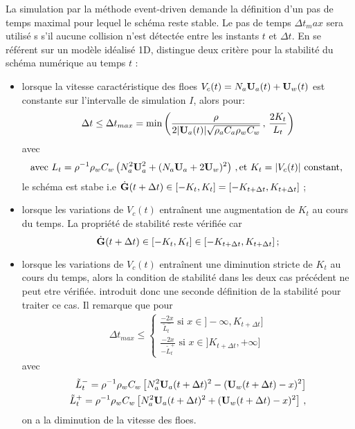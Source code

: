 La simulation par la méthode event-driven demande la définition d'un pas de temps maximal pour lequel le schéma reste stable. Le pas de temps $\Delta t_max$ sera utilisé s
s'il aucune collision n'est détectée entre les instants $t$ et $\Delta t$. En se référent sur un modèle idéalisé 1D, \citeauthor{rabatel2015thesis} distingue deux critère pour la stabilité du schéma numérique au temps $t$ :
\begin{itemize}
    \item lorsque la vitesse caractéristique des floes $V_c(t) = N_a \bm{\mathrm{U}}_a(t) + \bm{\mathrm{U}}_w(t)$ est constante sur l'intervalle de simulation $I$, alors pour:  
    \begin{align} \label{eq:dtmax1}
        \Delta t \leq \Delta t_{max} = \min{ \left(\frac{\rho}{2 \vert \bm{\mathrm{U}}_a(t) \vert \sqrt{\rho_a C_a \rho_w C_w}} \,, \,\frac{2K_t}{L_t} \right)}
    \end{align}
    avec 
    $$
    \text{avec } L_t = \rho^{-1} \rho_w C_w \left( N_a^2 \bm{\mathrm{U}}_a^2 + (N_a\bm{\mathrm{U}}_a + 2 \bm{\mathrm{U}}_w)^2 \right) \,, \text{et } K_t = \vert V_c(t) \vert \text{ constant, }
    $$
    le schéma est stabe i.e $\dot{\bm{\mathrm{G}}} (t + \Delta t) \in [-K_t, K_t] = [-K_{t + \Delta t}, K_{t + \Delta t}]$ ;
    \item lorsque les variations de $V_c(t)$ entraînent une augmentation de $K_t$ au cours du temps. La propriété de stabilité reste vérifiée car $$\dot{\bm{\mathrm{G}}} (t + \Delta t) \in [-K_t, K_t] \in [-K_{t + \Delta t}, K_{t + \Delta t}] \,;$$
    \item lorsque les variations de $V_c(t)$ entraînent une diminution stricte
    de $K_t$ au cours du temps, alors la condition de stabilité dans les deux cas précédent ne peut etre vérifiée. \citeauthor{rabatel2015thesis} introduit donc une seconde définition de la stabilité pour traiter ce cas. Il remarque que pour 
    \begin{align} \label{eq:dtmax2}
    \Delta t_{max} \leq \begin{cases}
        \frac{-2x}{\tilde{L}_t^{-}} \text{  si  } x \in  ]-\infty, K_{t+\Delta t}] \\
        \frac{-2x}{-\tilde{L}_t^{+}} \text{  si  } x \in  ]K_{t+\Delta t}, +\infty]
    \end{cases}\end{align}
    avec \begin{align*} \tilde{L}_t^{-} =  \rho^{-1} \rho_w C_w \left[ N_a^2 \bm{\mathrm{U}}_a(t+\Delta t)^2 - (\bm{\mathrm{U}}_w(t + \Delta t) - x)^2 \right] \\ \tilde{L}_t^{+} =  \rho^{-1} \rho_w C_w \left[ N_a^2 \bm{\mathrm{U}}_a(t+\Delta t)^2 + (\bm{\mathrm{U}}_w(t + \Delta t) - x)^2 \right] \,,
     \end{align*}
    on a la diminution de la vitesse des floes.
\end{itemize} 
